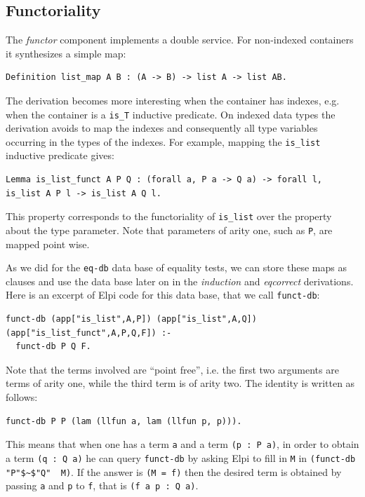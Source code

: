 \documentclass[a4paper,UKenglish,cleveref, autoref]{lipics-v2019}
\newcommand{\derive}[1]{\emph{#1}}
\begin{document}
\subsection{Functoriality} %

The \derive{functor} component implements a double service.
For non-indexed containers it synthesizes a simple map:

\begin{lstlisting}
Definition list_map A B : (A -> B) -> list A -> list AB.
\end{lstlisting}

\noindent
The derivation becomes more interesting when the container has indexes,
e.g. when the container is a \lstinline+is_T+ inductive predicate.
On indexed data types the derivation avoids to map the indexes and
consequently all type variables occurring in the types of the indexes.
For example, mapping the \lstinline+is_list+ inductive predicate gives:

\begin{lstlisting}
Lemma is_list_funct A P Q : (forall a, P a -> Q a) -> forall l, is_list A P l -> is_list A Q l.
\end{lstlisting}

\noindent
This property corresponds to the functoriality of \lstinline+is_list+
over the property about the type parameter. Note that parameters of
arity one, such as \lstinline+P+, are mapped point wise.

As we did for the \lstinline+eq-db+ data base of equality tests, we
can store these maps as clauses and use the data base later on in the
\derive{induction} and \derive{eqcorrect} derivations.
Here is an excerpt of Elpi code for this data base, that we call
\lstinline+funct-db+:

\begin{lstlisting}[]
funct-db (app["is_list",A,P]) (app["is_list",A,Q]) (app["is_list_funct",A,P,Q,F]) :-
  funct-db P Q F.
\end{lstlisting}

\noindent
Note that the terms involved are ``point free'', i.e.
the first two arguments are terms of arity one, while
the third term is of arity two. %
The identity is written as follows:

\begin{lstlisting}[]
funct-db P P (lam (llfun a, lam (llfun p, p))).
\end{lstlisting}

\noindent
This means that when one has a term \lstinline+a+
and a term \lstinline+(p : P a)+, in order to
obtain a term \lstinline+(q : Q a)+ he can
query \lstinline+funct-db+ by asking Elpi
to fill in \lstinline+M+ in \lstinline+(funct-db "P"$~$"Q"  M)+.
If the answer is \lstinline+(M = f)+ then
the desired term is
obtained by passing
\lstinline+a+ and \lstinline+p+ to \lstinline+f+, that is
\lstinline+(f a p : Q a)+.
\end{document}
